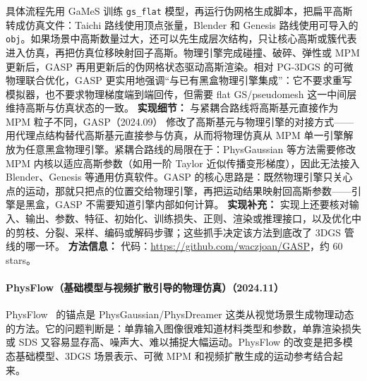 具体流程先用 GaMeS 训练 \texttt{gs\_flat} 模型，再运行伪网格生成脚本，把扁平高斯转成仿真文件：Taichi 路线使用顶点张量，Blender 和 Genesis 路线使用可导入的 \texttt{obj}。如果场景中高斯数量过大，还可以先生成层次结构，只让核心高斯或簇代表进入仿真，再把仿真位移映射回子高斯。物理引擎完成碰撞、破碎、弹性或 MPM 更新后，GASP 再用更新后的伪网格状态驱动高斯渲染。相对 PG-3DGS 的可微物理联合优化，GASP 更实用地强调“与已有黑盒物理引擎集成”：它不要求重写模拟器，也不要求物理梯度端到端回传，但需要 flat GS/pseudomesh 这一中间层维持高斯与仿真状态的一致。
\textbf{实现细节：} 与紧耦合路线将高斯基元直接作为 MPM 粒子不同，GASP（2024.09） 修改了高斯基元与物理引擎的对接方式——用代理点结构替代高斯基元直接参与仿真，从而将物理仿真从 MPM 单一引擎解放为任意黑盒物理引擎。紧耦合路线的局限在于：PhysGaussian 等方法需要修改 MPM 内核以适应高斯参数（如用一阶 Taylor 近似传播变形梯度），因此无法接入 Blender、Genesis 等通用仿真软件。GASP 的核心思路是：既然物理引擎只关心点的运动，那就只把点的位置交给物理引擎，再把运动结果映射回高斯参数——引擎是黑盒，GASP 不需要知道引擎内部如何计算。
\textbf{实现补充：} 实现上还要核对输入、输出、参数、特征、初始化、训练损失、正则、渲染或推理接口，以及优化中的剪枝、分裂、采样、编码或解码步骤；这些抓手决定该方法到底改了 3DGS 管线的哪一环。
\textbf{方法信息：} 代码：\url{https://github.com/waczjoan/GASP}，约 60 stars。
\paragraph{PhysFlow（基础模型与视频扩散引导的物理仿真）（2024.11）}
PhysFlow~\cite{2411_14423} 的锚点是 PhysGaussian/PhysDreamer 这类从视觉场景生成物理动态的方法。它的问题判断是：单靠输入图像很难知道材料类型和参数，单靠渲染损失或 SDS 又容易显存高、噪声大、难以捕捉大幅运动。PhysFlow 的改变是把多模态基础模型、3DGS 场景表示、可微 MPM 和视频扩散生成的运动参考结合起来。

